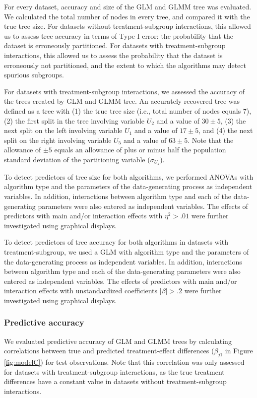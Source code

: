 \documentclass[nobf,doc]{apa}
\begin{document}
For every dataset, accuracy and size of the GLM and GLMM tree was evaluated. We calculated the total number of nodes in every tree, and compared it with the true tree size. For datasets without treatment-subgroup interactions, this allowed us to assess tree accuracy in terms of Type I error: the probability that the dataset is erroneously partitioned. For datasets with treatment-subgroup interactions, this allowed us to assess the probability that the dataset is erroneously not partitioned, and the extent to which the algorithms may detect spurious subgroups.

For datasets with treatment-subgroup interactions, we assessed the accuracy of the trees created by GLM and GLMM tree. An accurately recovered tree was defined as a tree with (1) the true tree size (i.e., total number of nodes equals 7), (2) the first split in the tree involving variable $U_2$ and a value of $30 \pm 5$, (3) the next split on the left involving variable $U_1$ and a value of $17 \pm 5$, and (4) the next split on the right involving variable $U_5$ and a value of $63 \pm 5$. Note that the allowance of $\pm 5$ equals an allowance of plus or minus half the population standard deviation of the partitioning variable ($\sigma_{U_k}$). 

To detect predictors of tree size for both algorithms, we performed ANOVAs with algorithm type and the parameters of the data-generating process as independent variables. In addition, interactions between algorithm type and each of the data-generating parameters were also entered as independent variables. The effects of predictors with main and/or interaction effects with $\eta^2 > .01$ were further investigated using graphical displays.

To detect predictors of tree accuracy for both algorithms in datasets with treatment-subgroup, we used a GLM with algorithm type and the parameters of the data-generating process as independent variables. In addition, interactions between algorithm type and each of the data-generating parameters were also entered as independent variables. The effects of predictors with main and/or interaction effects with unstandardized coefficients $|\beta| > .2$ were further investigated using graphical displays.

\subsubsection{Predictive accuracy} 

We evaluated predictive accuracy of GLM and GLMM trees by calculating correlations between true and predicted treatment-effect differences ($\beta_{j1}$ in Figure \ref{fig:modelC}) for test observations. Note that this correlation was only assessed for datasets with treatment-subgroup interactions, as the true treatment differences have a constant value in datasets without treatment-subgroup interactions.
\end{document}

